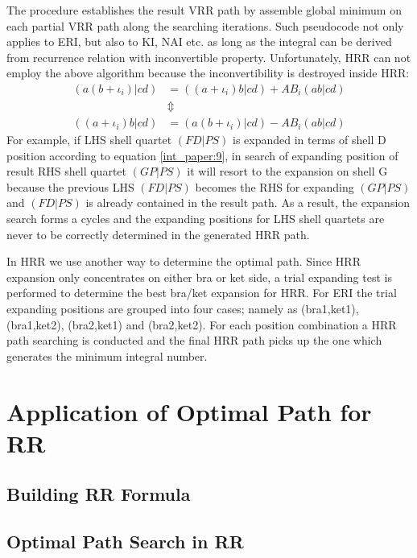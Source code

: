 The procedure establishes the result VRR path by assemble global minimum on each partial VRR
path along the searching iterations. Such pseudocode not only applies to ERI, but also to
KI, NAI etc. as long as the integral can be derived from recurrence relation with inconvertible
property. Unfortunately, HRR can not employ the above algorithm because the inconvertibility 
is destroyed inside HRR:
\begin{align}
\label{int_paper:9}
 (a(b+\iota_{i})|cd) &= ((a+\iota_{i})b|cd) + AB_{i}(ab|cd)   \nonumber \\
                     &\Updownarrow                            \nonumber \\
 ((a+\iota_{i})b|cd) &= (a(b+\iota_{i})|cd) - AB_{i}(ab|cd)   
\end{align}
For example, if LHS shell quartet $(FD|PS)$ is expanded in terms of shell D position according 
to equation \ref{int_paper:9}, in search of expanding position of result RHS shell quartet $(GP|PS)$
it will resort to the expansion on shell G because the previous LHS $(FD|PS)$ becomes the RHS for
expanding $(GP|PS)$ and $(FD|PS)$ is already contained in the result path. As a result, the expansion 
search forms a cycles and the expanding positions for LHS shell quartets are never to be correctly 
determined in the generated HRR path.

In HRR we use another way to determine the optimal path. Since HRR expansion only concentrates on
either bra or ket side, a trial expanding test is performed to determine the best bra/ket 
expansion for HRR. For ERI the trial expanding positions are grouped into four cases; namely 
as (bra1,ket1), (bra1,ket2), (bra2,ket1) and (bra2,ket2). For each position combination a HRR 
path searching is conducted and the final HRR path picks up the one which generates the minimum
integral number.

\section{Application of Optimal Path for RR}

\subsection{Building RR Formula}

\subsection{Optimal Path Search in RR}

